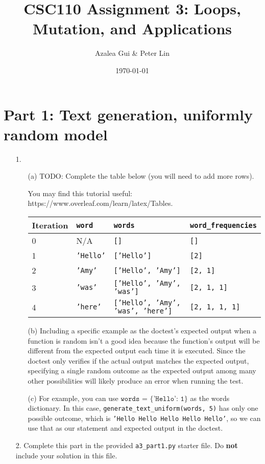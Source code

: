 \documentclass[fontsize=11pt]{article}
\title{CSC110 Assignment 3: Loops, Mutation, and Applications}
\author{Azalea Gui \& Peter Lin}
\date{\today}
\begin{document}
\maketitle

\section*{Part 1: Text generation, uniformly random model}

\begin{enumerate}

\item[1.]
\begin{enumerate}
    \item[(a)]
    TODO: Complete the table below (you will need to add more rows).

    You may find this tutorial useful: https://www.overleaf.com/learn/latex/Tables.

    \begin{tabular}{|l|l|l|l|}
    \hline
    Iteration & \verb|word| & \verb|words| & \verb|word_frequencies|\\
    \hline
    0 & N/A & \texttt{[]} & \texttt{[]} \\
    1 & \texttt{'Hello'} & \texttt{['Hello']} & \texttt{[2]} \\
    2 & \texttt{'Amy'} & \texttt{['Hello', 'Amy']} & \texttt{[2, 1]} \\
    3 & \texttt{'was'} & \texttt{['Hello', 'Amy', 'was']} & \texttt{[2, 1, 1]} \\
    4 & \texttt{'here'} & \texttt{['Hello', 'Amy', 'was', 'here']} & \texttt{[2, 1, 1, 1]} \\
    \hline
    \end{tabular}

    \item[(b)]
    Including a specific example as the doctest's expected output when a function is random isn't a good idea because the function's output will be different from the expected output each time it is executed. Since the doctest only verifies if the actual output matches the expected output, specifying a single random outcome as the expected output among many other possibilities will likely produce an error when running the test.

    \item[(c)]
    For example, you can use $\texttt{words = \{'Hello': 1\}}$ as the words dictionary. In this case, \texttt{generate\_text\_uniform(words, 5)} has only one possible outcome, which is \texttt{'Hello Hello Hello Hello Hello'}, so we can use that as our statement and expected output in the doctest.
\end{enumerate}

\item[2.]
Complete this part in the provided \texttt{a3\_part1.py} starter file.
Do \textbf{not} include your solution in this file.

\end{enumerate}
\end{document}
